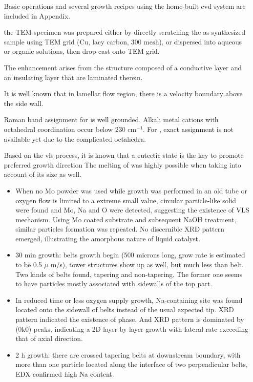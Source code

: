 Basic operations and several growth recipes using the home-built cvd system are included in Appendix.

the TEM specimen was prepared either by directly scratching the as-synthesized sample using TEM grid (Cu, lacy carbon, 300 mesh), or dispersed into aqueous or organic solutions, then drop-cast onto TEM grid. 


The enhancement arises from the structure composed of a conductive layer and an insulating layer that are laminated therein.\cite{Shingaya2013}

It is well known that in lamellar flow region, there is a velocity boundary above the side wall.

Raman band assignment for  is well grounded. Alkali metal cations with octahedral coordination occur below 230 cm$^{-1}$. For , exact assignment is not available yet due to the complicated  octahedra.

Based on the vls process, it is known that a eutectic state is the key to promote preferred growth direction
The melting of  was highly possible when taking into account of its size as well.\cite{Bruggemann1997} 

\begin{itemize}

\item When no Mo powder was used while growth was performed in an old tube or oxygen flow is limited to a extreme small value, circular particle-like solid were found and Mo, Na and O were detected, suggesting the existence of VLS mechanism. Using Mo coated substrate and subsequent NaOH treatment, similar particles formation was repeated. No discernible XRD pattern emerged, illustrating the amorphous nature of liquid catalyst.
\item 30 min growth: belts growth begin (500 microns long, grow rate is estimated to be 0.5 $\mu$ m/s), tower structures show up as well, but much less than belt. Two kinds of belts found, tapering and non-tapering. The former one seems to have particles mostly associated with sidewalls of the top part.
\item In reduced time or less oxygen supply growth, Na-containing site was found located onto the sidewall of belts instead of the usual expected tip. XRD pattern indicated the existence of  phase. And  XRD pattern is dominated by (0k0) peaks, indicating a 2D layer-by-layer growth with lateral rate exceeding that of axial direction.
\item 2 h growth: there are crossed tapering belts at downstream boundary, with more than one particle located along the interface of two perpendicular belts, EDX confirmed high Na content.

\end{itemize}

